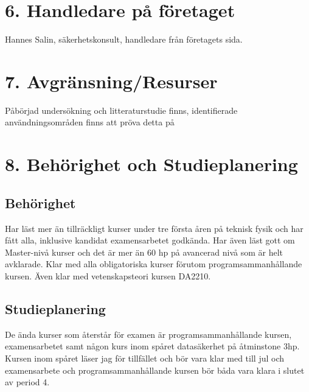 \documentclass[a4paper,11pt]{report}
\begin{document}
\section*{6. Handledare på företaget}
Hannes Salin, säkerhetskonsult, handledare från företagets sida.
\section*{7. Avgränsning/Resurser}
Påbörjad undersökning och litteraturstudie finns, identifierade användningsområden finns att pröva detta på
\section*{8. Behörighet och Studieplanering}

\subsection*{Behörighet}
Har läst mer än tillräckligt kurser under tre första åren på teknisk fysik
och har fått alla, inklusive kandidat examensarbetet godkända. Har även
läst gott om Master-nivå kurser och det är mer än 60 hp på avancerad nivå
som är helt avklarade. Klar med alla obligatoriska kurser förutom 
programsammanhållande kursen. Även klar med vetenskapsteori kursen DA2210.
\subsection*{Studieplanering}
De ända kurser som återstår för examen är programsammanhållande kursen,
examensarbetet samt någon kurs inom spåret datasäkerhet på åtminstone 3hp. 
Kursen inom spåret läser jag för tillfället och bör vara klar med till jul
och examensarbete och programsammanhållande kursen bör båda vara klara
i slutet av period 4. 
\end{document}
